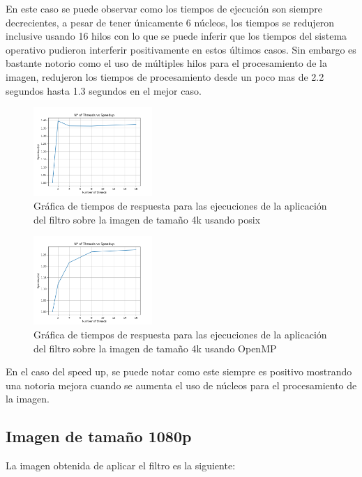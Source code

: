 En este caso se puede observar como los tiempos de ejecución son siempre decrecientes, a pesar de tener únicamente 6 núcleos, los tiempos se redujeron inclusive usando 16 hilos con lo que se puede inferir que los tiempos del sistema operativo pudieron interferir positivamente en estos últimos casos. Sin embargo es bastante notorio como el uso de múltiples hilos para el procesamiento de la imagen, redujeron los tiempos de procesamiento desde un poco mas de 2.2 segundos hasta 1.3 segundos en el mejor caso.

\begin{figure}[H]
    \centering
    \includegraphics[width=0.4\textwidth]{../plots/4k_speedup.png}
    \caption{Gráfica de tiempos de respuesta para las ejecuciones de la aplicación del filtro sobre la imagen de tamaño 4k usando posix}
\end{figure}

\begin{figure}[H]
    \centering
    \includegraphics[width=0.4\textwidth]{../plots/omp_4k_speedup.png}
    \caption{Gráfica de tiempos de respuesta para las ejecuciones de la aplicación del filtro sobre la imagen de tamaño 4k usando OpenMP}
\end{figure}

En el caso del speed up, se puede notar como este siempre es positivo mostrando una notoria mejora cuando se aumenta el uso de núcleos para el procesamiento de la imagen.

\subsection{Imagen de tamaño 1080p}

La imagen obtenida de aplicar el filtro es la siguiente:

